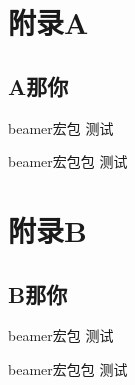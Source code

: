 \documentclass[hyperref, UTF8, CJK]{beamer}
\begin{document}
\appendix
\section{附录A}
\subsection[short]{A那你}
\begin{frame}{beamer宏包}\label{frame:abc}
	测试
\end{frame}

\begin{frame}{beamer宏包包}\label{frame:adc}
	测试
\end{frame}

\section{附录B}
\subsection[short]{B那你}
\begin{frame}{beamer宏包}\label{frame:abd}
	测试
\end{frame}

\begin{frame}{beamer宏包包}\label{frame:add}
	测试
\end{frame}
\end{document}
